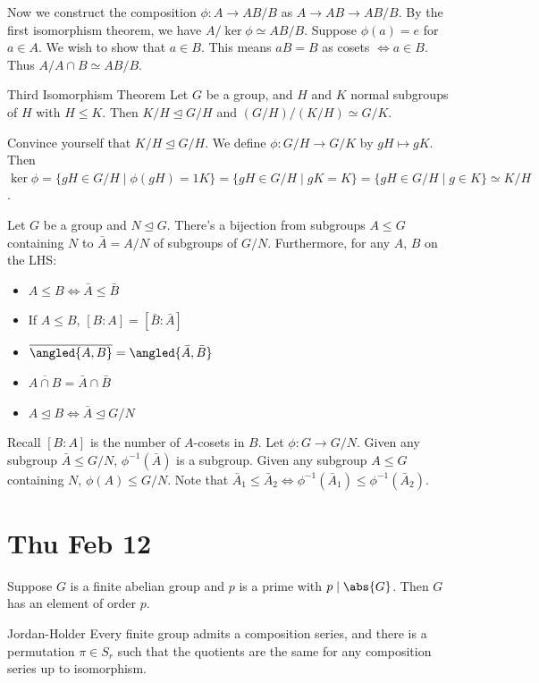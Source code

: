 \documentclass{article}
\begin{document}
Now we construct the composition $\phi: A \to AB/B$ as $A \to AB \to AB/B$. By the first isomorphism theorem, we have $A/\ker{\phi} \simeq AB/B$. Suppose $\phi(a) = e$ for $a \in A$. We wish to show that $a \in B$. This means $aB=B$ as cosets $\iff a \in B$. Thus $A/A\cap B \simeq AB/B$.

\begin{theorem}{Third Isomorphism Theorem}{}
Let $G$ be a group, and $H$ and $K$ normal subgroups of $H$ with $H \leq K$. Then $K / H \trianglelefteq G/H$ and $(G/H)/(K/H) \simeq G/K$. 
\end{theorem}
\proof
Convince yourself that $K/H \trianglelefteq G/H$. We define $\phi: G/H \to G/K$ by $gH \mapsto gK$. Then $\ker \phi = \{gH \in G/H \mid \phi(gH) = 1K\} = \{gH \in G/H \mid gK=K\} = \{gH \in G/H \mid g \in K\} \simeq K/H$.

\begin{theorem}
  Let $G$ be a group and $N \trianglelefteq G$. There's a bijection from subgroups $A \leq G$ containing $N$ to $\bar{A} = A/N$ of subgroups of $G/N$. Furthermore, for any $A$, $B$ on the LHS:
  \begin{itemize}
  \item $A \leq B \iff \bar{A} \leq \bar{B}$ 
  \item If $A \leq B$, $[B:A] = [\bar{B}:\bar{A}]$
  \item $\overline{\angled{A,B}} = \angled{\bar{A},\bar{B}}$
  \item $\overline{A \cap B} = \bar{A} \cap \bar{B}$
  \item $A \trianglelefteq B \iff \bar{A} \trianglelefteq G/N$
  \end{itemize}
\end{theorem}
Recall $[B:A]$ is the number of $A$-cosets in $B$.
\proof
Let $\phi: G \to G/N$. Given any subgroup $\bar{A} \leq G/N$, $\phi^{-1}(\bar{A})$ is a subgroup. Given any subgroup $A \leq G$ containing $N$, $\phi(A) \leq G/N$.
Note that $\bar{A}_1 \leq \bar{A}_2 \iff \phi^{-1}(\bar{A}_1) \leq \phi^{-1}(\bar{A}_2)$.

\section{Thu Feb 12}
\begin{prop}
Suppose $G$ is a finite abelian group and $p$ is a prime with $p \mid \abs{G}$. Then $G$ has an element of order $p$. 
\end{prop}

\begin{theorem}{Jordan-Holder}{}
Every finite group admits a composition series, and there is a permutation $\pi \in S_r$ such that the quotients are the same for any composition series up to isomorphism. 
\end{theorem}
\end{document}
